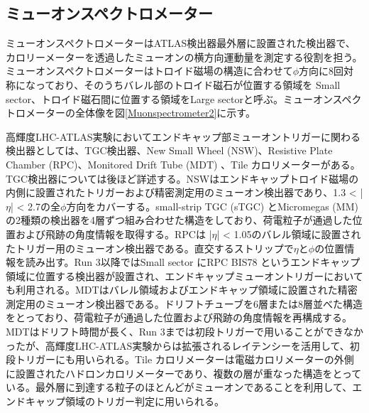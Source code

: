 \subsection{ミューオンスペクトロメーター}
\label{subsec_Muonspectrometer}
ミューオンスペクトロメーターはATLAS検出器最外層に設置された検出器で、カロリーメーターを透過したミューオンの横方向運動量を測定する役割を担う。
ミューオンスペクトロメーターはトロイド磁場の構造に合わせて$\phi$方向に8回対称になっており、そのうちバレル部のトロイド磁石が位置する領域を Small sector、トロイド磁石間に位置する領域をLarge sectorと呼ぶ。ミューオンスペクトロメーターの全体像を図\ref{Muonspectrometer2}に示す。

高輝度LHC-ATLAS実験においてエンドキャップ部ミューオントリガーに関わる検出器としては、TGC検出器、New Small Wheel (NSW)、Resistive Plate Chamber (RPC)、Monitored Drift Tube (MDT) 、Tile カロリメーターがある。TGC検出器については後ほど詳述する。NSWはエンドキャップトロイド磁場の内側に設置されたトリガーおよび精密測定用のミューオン検出器であり、1.3 < |$\eta$| < 2.7の全$\phi$方向をカバーする。small-strip TGC (sTGC) とMicromegas (MM) の2種類の検出器を4層ずつ組み合わせた構造をしており、荷電粒子が通過した位置および飛跡の角度情報を取得する。RPCは |$\eta$| < 1.05のバレル領域に設置されたトリガー用のミューオン検出器である。直交するストリップで$\eta$と$\phi$の位置情報を読み出す。Run 3以降ではSmall sector にRPC BIS78 というエンドキャップ領域に位置する検出器が設置され、エンドキャップミューオントリガーにおいても利用される。MDTはバレル領域およびエンドキャップ領域に設置された精密測定用のミューオン検出器である。ドリフトチューブを6層または8層並べた構造をとっており、荷電粒子が通過した位置および飛跡の角度情報を再構成する。MDTはドリフト時間が長く、Run 3までは初段トリガーで用いることができなかったが、高輝度LHC-ATLAS実験からは拡張されるレイテンシーを活用して、初段トリガーにも用いられる。Tile カロリメーターは電磁カロリメーターの外側に設置されたハドロンカロリメーターであり、複数の層が重なった構造をとっている。最外層に到達する粒子のほとんどがミューオンであることを利用して、エンドキャップ領域のトリガー判定に用いられる。


